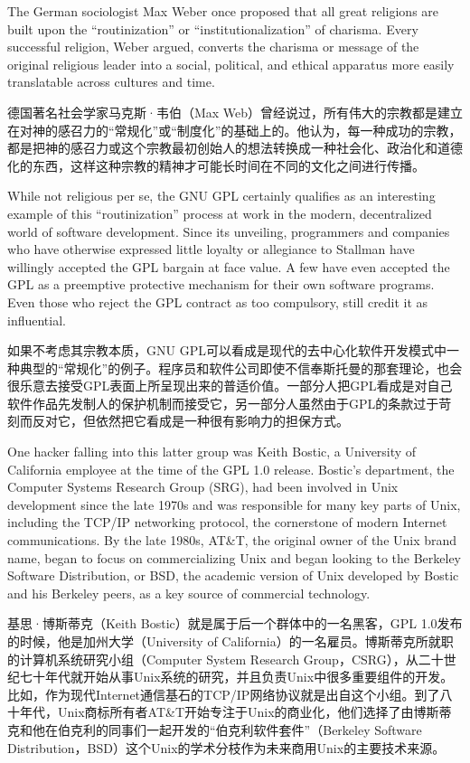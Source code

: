 \ifdefined\eng
The German sociologist Max Weber once proposed that all great religions are built upon the ``routinization'' or ``institutionalization'' of charisma. Every successful religion, Weber argued, converts the charisma or message of the original religious leader into a social, political, and ethical apparatus more easily translatable across cultures and time.
\fi

\ifdefined\chs
德国著名社会学家马克斯·韦伯（Max Web）曾经说过，所有伟大的宗教都是建立在对神的感召力的``常规化''或``制度化''的基础上的。他认为，每一种成功的宗教，都是把神的感召力或这个宗教最初创始人的想法转换成一种社会化、政治化和道德化的东西，这样这种宗教的精神才可能长时间在不同的文化之间进行传播。
\fi

\ifdefined\eng
While not religious per se, the GNU GPL certainly qualifies as an interesting example of this ``routinization'' process at work in the modern, decentralized world of software development. Since its unveiling, programmers and companies who have otherwise expressed little loyalty or allegiance to Stallman have willingly accepted the GPL bargain at face value. A few have even accepted the GPL as a preemptive protective mechanism for their own software programs. Even those who reject the GPL contract as too compulsory, still credit it as influential.
\fi

\ifdefined\chs
如果不考虑其宗教本质，GNU GPL可以看成是现代的去中心化软件开发模式中一种典型的``常规化''的例子。程序员和软件公司即使不信奉斯托曼的那套理论，也会很乐意去接受GPL表面上所呈现出来的普适价值。一部分人把GPL看成是对自己软件作品先发制人的保护机制而接受它，另一部分人虽然由于GPL的条款过于苛刻而反对它，但依然把它看成是一种很有影响力的担保方式。
\fi

\ifdefined\eng
One hacker falling into this latter group was Keith Bostic, a University of California employee at the time of the GPL 1.0 release. Bostic's department, the Computer Systems Research Group (SRG), had been involved in Unix development since the late 1970s and was responsible for many key parts of Unix, including the TCP/IP networking protocol, the cornerstone of modern Internet communications. By the late 1980s, AT\&T, the original owner of the Unix brand name, began to focus on commercializing Unix and began looking to the Berkeley Software Distribution, or BSD, the academic version of Unix developed by Bostic and his Berkeley peers, as a key source of commercial technology.
\fi

\ifdefined\chs
基思·博斯蒂克（Keith Bostic）就是属于后一个群体中的一名黑客，GPL 1.0发布的时候，他是加州大学（University of California）的一名雇员。博斯蒂克所就职的计算机系统研究小组（Computer System Research Group，CSRG），从二十世纪七十年代就开始从事Unix系统的研究，并且负责Unix中很多重要组件的开发。比如，作为现代Internet通信基石的TCP/IP网络协议就是出自这个小组。到了八十年代，Unix商标所有者AT\&T开始专注于Unix的商业化，他们选择了由博斯蒂克和他在伯克利的同事们一起开发的``伯克利软件套件''（Berkeley Software Distribution，BSD）这个Unix的学术分枝作为未来商用Unix的主要技术来源。
\fi

